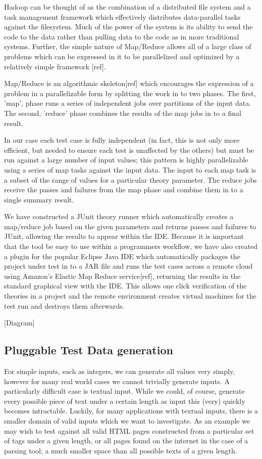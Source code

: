 \documentclass[10pt,journal,cspaper,compsoc]{IEEEtran}
\begin{document}
Hadoop can be thought of as the combination of a distributed file system and a task management framework which effectively distributes data-parallel tasks against the filesystem. Much of the power of the system is its ability to send the code to the data rather than pulling data to the code as in more traditional systems. Further, the simple nature of Map/Reduce allows all of a large class of problems which can be expressed in it to be parallelized and optimized by a relatively simple framework [ref]. 

Map/Reduce is an algorithmic skeleton[ref] which encourages the expression of a problem in a parallelizable form by splitting the work in to two phases. The first, 'map', phase runs a series of independent jobs over partitions of the input data. The second, 'reduce' phase combines the results of the map jobs in to a final result. 

In our case each test case is fully independent (in fact, this is not only more efficient, but needed to ensure each test is unaffected by the others) but must be run against a large number of input values; this pattern is highly parallelizable using a series of map tasks against the input data. The input to each map task is a subset of the range of values for a particular theory parameter. The reduce jobs receive the passes and failures from the map phase and combine them in to a single summary result. 

We have constructed a JUnit theory runner which automatically creates a map/reduce job based on the given parameters and returns passes and failures to JUnit, allowing the results to appear within the IDE. Because it is important that the tool be easy to use within a programmers workflow, we have also created a plugin for the popular Eclipse Java IDE which automatically packages the project under test in to a JAR file and runs the test cases across a remote cloud using Amazon's Elastic Map Reduce service[ref], returning the results in the standard graphical view with the IDE. This allows one click verification of the theories in a project and the remote environment creates virtual machines for the test run and destroys them afterwards.

[Diagram]

\subsection{Pluggable Test Data generation}

For simple inputs, such as integers, we can generate all values very simply, however for many real world cases we cannot trivially generate inputs. A particularly difficult case is textual input. While we could, of course, generate every possible piece of text under a certain length as input this (very) quickly becomes intractable. Luckily, for many applications with textual inputs, there is a smaller domain of valid inputs which we want to investigate. As an example we may wish to test against all valid HTML pages constructed from a particular set of tags under a given length, or all pages found on the internet in the case of a parsing tool; a much smaller space than all possible texts of a given length. 
\end{document}
